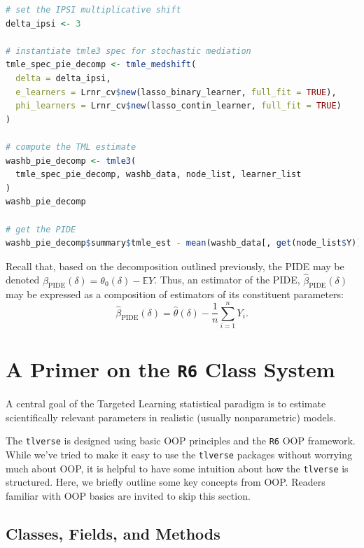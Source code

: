 \documentclass[12pt, krantz2,]{krantz}
\newcommand{\passthrough}[1]{#1}
\theoremstyle{definition}
\theoremstyle{definition}
\theoremstyle{definition}
\newcommand{\1}{\mathbbm{1}}
\begin{document}
\begin{lstlisting}[language=R]
# set the IPSI multiplicative shift
delta_ipsi <- 3

# instantiate tmle3 spec for stochastic mediation
tmle_spec_pie_decomp <- tmle_medshift(
  delta = delta_ipsi,
  e_learners = Lrnr_cv$new(lasso_binary_learner, full_fit = TRUE),
  phi_learners = Lrnr_cv$new(lasso_contin_learner, full_fit = TRUE)
)

# compute the TML estimate
washb_pie_decomp <- tmle3(
  tmle_spec_pie_decomp, washb_data, node_list, learner_list
)
washb_pie_decomp

# get the PIDE
washb_pie_decomp$summary$tmle_est - mean(washb_data[, get(node_list$Y)])
\end{lstlisting}

Recall that, based on the decomposition outlined previously, the PIDE may be
denoted \(\beta_{\text{PIDE}}(\delta) = \theta_0(\delta) - \mathbb{E}Y\). Thus,
an estimator of the PIDE, \(\hat{\beta}_{\text{PIDE}}(\delta)\) may be expressed
as a composition of estimators of its constituent parameters:
\begin{equation*}
  \hat{\beta}_{\text{PIDE}}({\delta}) = \hat{\theta}(\delta) -
  \frac{1}{n} \sum_{i = 1}^n Y_i.
\end{equation*}

\hypertarget{r6}{%
\chapter{\texorpdfstring{A Primer on the \texttt{R6} Class System}{A Primer on the R6 Class System}}\label{r6}}

A central goal of the Targeted Learning statistical paradigm is to estimate
scientifically relevant parameters in realistic (usually nonparametric) models.

The \passthrough{\lstinline!tlverse!} is designed using basic OOP principles and the \passthrough{\lstinline!R6!} OOP framework.
While we've tried to make it easy to use the \passthrough{\lstinline!tlverse!} packages without worrying
much about OOP, it is helpful to have some intuition about how the \passthrough{\lstinline!tlverse!} is
structured. Here, we briefly outline some key concepts from OOP. Readers
familiar with OOP basics are invited to skip this section.

\hypertarget{classes-fields-and-methods}{%
\section{Classes, Fields, and Methods}\label{classes-fields-and-methods}}
\end{document}
